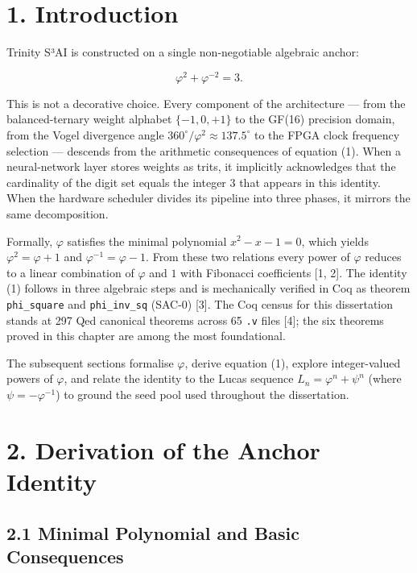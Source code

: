 \section{1. Introduction}\label{fa_03:introduction}

Trinity S³AI is constructed on a single
non-negotiable algebraic anchor:

\begin{equation}
\varphi^2 + \varphi^{-2} = 3. \tag{1}
\end{equation}

This is not a decorative choice. Every component
of the architecture --- from the balanced-ternary
weight alphabet \(\{-1, 0, +1\}\) to the GF(16)
precision domain, from the Vogel divergence angle
\(360^\circ/\varphi^2 \approx 137.5^\circ\) to the FPGA
clock frequency selection --- descends from the
arithmetic consequences of equation (1). When a
neural-network layer stores weights as trits, it
implicitly acknowledges that the cardinality of
the digit set equals the integer \(3\) that
appears in this identity. When the hardware
scheduler divides its pipeline into three phases,
it mirrors the same decomposition.

Formally, \(\varphi\) satisfies the minimal
polynomial \(x^2 - x - 1 = 0\), which yields
\(\varphi^2 = \varphi + 1\) and
\(\varphi^{-1} = \varphi - 1\). From these two
relations every power of \(\varphi\) reduces to a
linear combination of \(\varphi\) and \(1\) with
Fibonacci coefficients [1, 2]. The identity
(1) follows in three algebraic steps and is
mechanically verified in Coq as theorem
\texttt{phi\_square} and \texttt{phi\_inv\_sq}
(SAC-0) [3]. The Coq census for this
dissertation stands at 297 Qed canonical theorems
across 65 \texttt{.v} files [4]; the six
theorems proved in this chapter are among the most
foundational.

The subsequent sections formalise \(\varphi\),
derive equation (1), explore integer-valued powers
of \(\varphi\), and relate the identity to the
Lucas sequence \(L_n = \varphi^n + \psi^n\) (where
\(\psi = -\varphi^{-1}\)) to ground the seed pool
used throughout the dissertation.

\section{2. Derivation of the Anchor
Identity}\label{fa_03:derivation-of-the-anchor-identity}

\subsection{2.1 Minimal Polynomial and Basic
Consequences}\label{fa_03:minimal-polynomial-and-basic-consequences}

